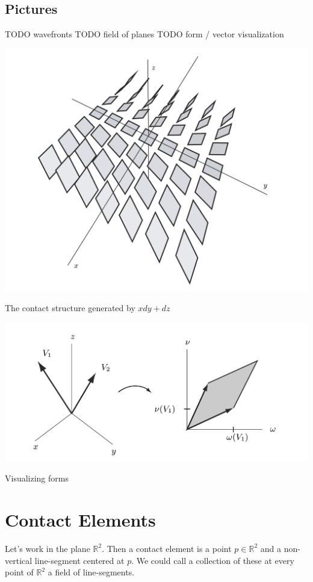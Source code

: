 \documentclass{article}
\begin{document}
\subsection {Pictures}

TODO wavefronts
TODO field of planes
TODO form / vector visualization

\includegraphics[scale=0.3]{contact_elements_bachman}

The contact structure generated by $xdy + dz$

\includegraphics[scale=0.5]{form_vis_bachman}

Visualizing forms

\pagebreak


\section {Contact Elements}

Let's work in the plane $\mathbb{R}^{2}$. Then a contact element is a point $p
\in \mathbb{R}^{2}$ and a non-vertical line-segment centered at $p$. We could
call a collection of these at every point of $\mathbb{R}^{2}$ a field of line-segments.
\end{document}
